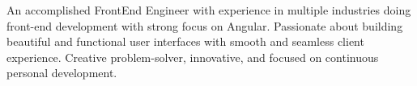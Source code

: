 

\begin{cvparagraph}

An accomplished FrontEnd Engineer with experience in multiple industries doing front-end development with strong focus on Angular. Passionate about building beautiful and functional user interfaces with smooth and seamless client experience. Creative problem-solver, innovative, and focused on continuous personal development.

\end{cvparagraph}
